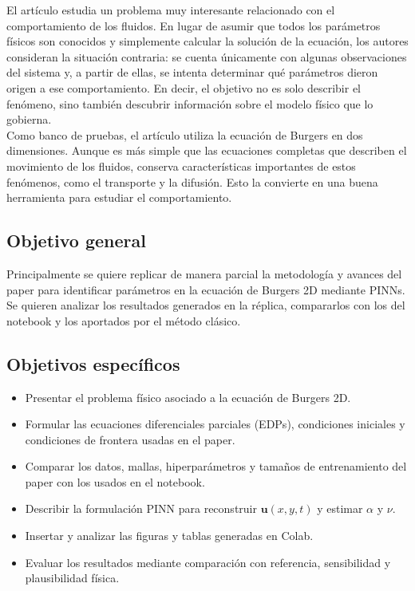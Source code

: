 \documentclass[10pt,letterpaper,twocolumn]{article}
\begin{document}
El artículo estudia un problema muy interesante relacionado con el comportamiento de los fluidos. En lugar de asumir que todos los parámetros físicos son conocidos y simplemente calcular la solución de la ecuación, los autores consideran la situación contraria: se cuenta únicamente con algunas observaciones del sistema y, a partir de ellas, se intenta determinar qué parámetros dieron origen a ese comportamiento. En decir, el objetivo no es solo describir el fenómeno, sino también descubrir información sobre el modelo físico que lo gobierna.\\

Como banco de pruebas, el artículo utiliza la ecuación de Burgers en dos dimensiones. Aunque es más simple que las ecuaciones completas que describen el movimiento de los fluidos, conserva características importantes de estos fenómenos, como el transporte y la difusión. Esto la convierte en una buena herramienta para estudiar el comportamiento.

\subsection{Objetivo general}

Principalmente se quiere replicar de manera parcial la metodología y avances del paper para identificar parámetros en la ecuación de Burgers 2D mediante PINNs. Se quieren analizar los resultados generados en la réplica, compararlos con los del notebook y los aportados por el método clásico.

\subsection{Objetivos específicos}

\begin{itemize}[leftmargin=*]
    \item Presentar el problema físico asociado a la ecuación de Burgers 2D.
    \item Formular las ecuaciones diferenciales parciales (EDPs), condiciones iniciales y condiciones de frontera usadas en el paper.
    \item Comparar los datos, mallas, hiperparámetros y tamaños de entrenamiento del paper con los usados en el notebook.
    \item Describir la formulación PINN para reconstruir $\mathbf{u}(x,y,t)$ y estimar $\alpha$ y $\nu$.
    \item Insertar y analizar las figuras y tablas generadas en Colab.
    \item Evaluar los resultados mediante comparación con referencia, sensibilidad y plausibilidad física.
\end{itemize}
\end{document}
